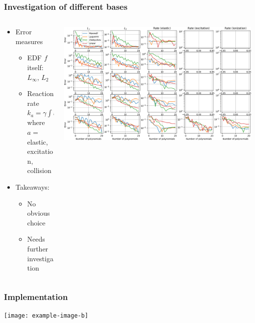 \documentclass[mathserif, aspectratio=169]{beamer}
\newcommand{\ud}{\,\mathrm{d}}
\begin{document}
\begin{frame}
\frametitle{Investigation of different bases}
%
\begin{columns}[T]
\begin{column}{0.3\linewidth}
\begin{itemize}
\item Error measures
\begin{itemize}
\item EDF $f$ itself: $L_\infty$, $L_2$
\item Reaction rate
$k_a = \gamma \int \varepsilon \sigma_a f \ud \varepsilon$
where 
\\$a=$ elastic, excitation, collision
\end{itemize}
\item Takeaways:
\begin{itemize}
\item No obvious choice
\item Needs further investigation
\end{itemize}
\end{itemize}
\end{column}
\begin{column}{0.7\linewidth}
  \vspace{-0.35in}
  \begin{center}
   \includegraphics[width=\textwidth]{figures/bolsig_convergence.png}
  \end{center}
\end{column}
\end{columns}
%
\end{frame}



\begin{frame}
\frametitle{Implementation}
%
\begin{center}
   \texttt{[image: example-image-b]}
\end{center}
%
\end{frame}


\end{document}
